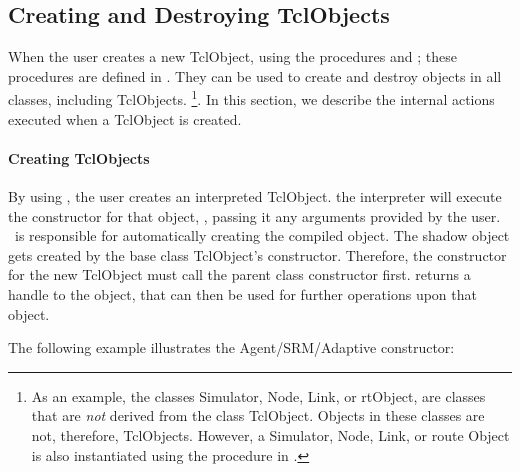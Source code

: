 \subsection{Creating and Destroying TclObjects}
\label{sec:Creation}

When the user creates a new TclObject,
using the procedures  and ;
these procedures are defined in .
They can be used to create and destroy objects in all classes,
including TclObjects.%
\footnote{As an example, the classes Simulator, Node, Link, or rtObject,
are classes that are \emph{not} derived from the class TclObject.
Objects in these classes  are not, therefore, TclObjects.
However, a Simulator, Node, Link, or route Object is also instantiated
using the  procedure in \ns.}.
In this section,
we describe the internal actions executed when a TclObject
is created.

\paragraph{Creating TclObjects}
By using , the user creates an interpreted TclObject.
the interpreter will execute the constructor for that object, ,
passing it any arguments provided by the user.
\ns\ is responsible for automatically  creating the compiled object.
The shadow object gets created by the base class TclObject's constructor.
Therefore, the constructor for the new TclObject
must call the parent class constructor first.
 returns a handle to the object, that can then be used
for further operations upon that object.

The following example illustrates the Agent/SRM/Adaptive constructor:

